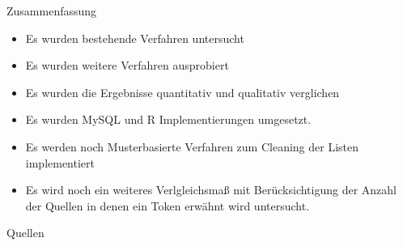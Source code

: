 \documentclass{beamer}
\begin{document}
\begin{frame}{Zusammenfassung}
	\begin{itemize}
		\item{Es wurden bestehende Verfahren untersucht}
		\item{Es wurden weitere Verfahren ausprobiert}
		\item{Es wurden die Ergebnisse quantitativ und qualitativ verglichen}
		\item{Es wurden MySQL und R Implementierungen umgesetzt.}
		\item{Es werden noch Musterbasierte Verfahren zum Cleaning der Listen implementiert}
		\item{Es wird noch ein weiteres Verlgleichsmaß mit Ber\"ucksichtigung der Anzahl der Quellen in denen ein Token erw\"ahnt wird untersucht.}
	\end{itemize}
\end{frame}


\begin{frame}[allowframebreaks]{Quellen}
	\nocite{*}
	
    
\end{frame}
\end{document}
